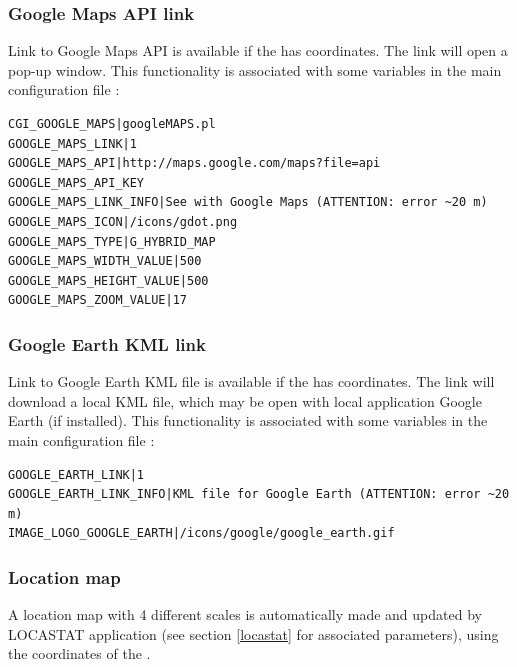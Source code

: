 \subsubsection{Google Maps API link}

Link to Google Maps API is available if the  has coordinates. The link will open a pop-up window. This functionality is associated with some variables in the main configuration file :

\begin{lstlisting}[title=\wofile{WEBOBS.rc} (excerpt)]
CGI_GOOGLE_MAPS|googleMAPS.pl
GOOGLE_MAPS_LINK|1
GOOGLE_MAPS_API|http://maps.google.com/maps?file=api
GOOGLE_MAPS_API_KEY
GOOGLE_MAPS_LINK_INFO|See with Google Maps (ATTENTION: error ~20 m)
GOOGLE_MAPS_ICON|/icons/gdot.png
GOOGLE_MAPS_TYPE|G_HYBRID_MAP
GOOGLE_MAPS_WIDTH_VALUE|500
GOOGLE_MAPS_HEIGHT_VALUE|500
GOOGLE_MAPS_ZOOM_VALUE|17
\end{lstlisting}

\subsubsection{Google Earth KML link}

Link to Google Earth KML file is available if the  has coordinates. The link will download a local KML file, which may be open with local application Google Earth (if installed). This functionality is associated with some variables in the main configuration file :

\begin{lstlisting}[title=\wofile{WEBOBS.rc} (excerpt)]
GOOGLE_EARTH_LINK|1
GOOGLE_EARTH_LINK_INFO|KML file for Google Earth (ATTENTION: error ~20 m)
IMAGE_LOGO_GOOGLE_EARTH|/icons/google/google_earth.gif
\end{lstlisting}

\subsubsection{Location map}

A location map with 4 different scales is automatically made and updated by LOCASTAT application (see section \ref{locastat} for associated parameters), using the coordinates of the .


